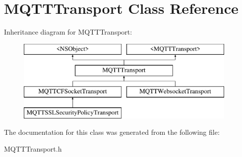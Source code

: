 \hypertarget{interface_m_q_t_t_transport}{}\section{M\+Q\+T\+T\+Transport Class Reference}
\label{interface_m_q_t_t_transport}
Inheritance diagram for M\+Q\+T\+T\+Transport\+:\begin{figure}[H]
\begin{center}
\leavevmode
\includegraphics[height=4.000000cm]{interface_m_q_t_t_transport}
\end{center}
\end{figure}


The documentation for this class was generated from the following file\+:\begin{DoxyCompactItemize}
\item 
M\+Q\+T\+T\+Transport.\+h\end{DoxyCompactItemize}
